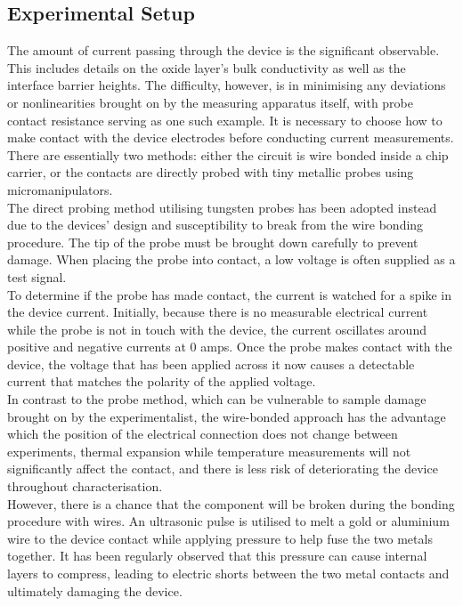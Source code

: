 \subsection[Experimental Setup]{Experimental Setup}

The amount of current passing through the device is the significant observable. This includes details on the oxide layer's bulk conductivity as well as the interface barrier heights. The difficulty, however, is in minimising any deviations or nonlinearities brought on by the measuring apparatus itself, with probe contact resistance serving as one such example. It is necessary to choose how to make contact with the device electrodes before conducting current measurements. There are essentially two methods: either the circuit is wire bonded inside a chip carrier, or the contacts are directly probed with tiny metallic probes using micromanipulators. \\

\noindent The direct probing method utilising tungsten probes has been adopted instead due to the devices' design and susceptibility to break from the wire bonding procedure. The tip of the probe must be brought down carefully to prevent damage. When placing the probe into contact, a low voltage is often supplied as a test signal. \\

\noindent To determine if the probe has made contact, the current is watched for a spike in the device current. Initially, because there is no measurable electrical current while the probe is not in touch with the device, the current oscillates around positive and negative currents at 0 amps. Once the probe makes contact with the device, the voltage that has been applied across it now causes a detectable current that matches the polarity of the applied voltage. \\

\noindent In contrast to the probe method, which can be vulnerable to sample damage brought on by the experimentalist, the wire-bonded approach has the advantage which the position of the electrical connection does not change between experiments, thermal expansion while temperature measurements will not significantly affect the contact, and there is less risk of deteriorating the device throughout characterisation. \\

\noindent However, there is a chance that the component will be broken during the bonding procedure with wires. An ultrasonic pulse is utilised to melt a gold or aluminium wire to the device contact while applying pressure to help fuse the two metals together. It has been regularly observed that this pressure can cause internal layers to compress, leading to electric shorts between the two metal contacts and ultimately damaging the device. 

